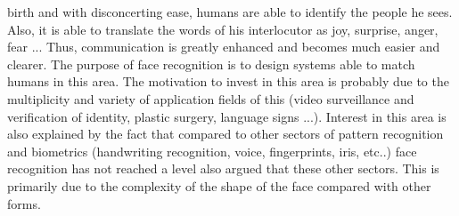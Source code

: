  birth and with disconcerting ease, humans are able to identify the people he sees. Also, it is able to translate the words of his interlocutor as joy, surprise, anger, fear ... Thus, communication is greatly enhanced and becomes much easier and clearer.
The purpose of face recognition is to design systems able to match humans in this area.
The motivation to invest in this area is probably due to the multiplicity and variety of application fields of this (video surveillance and verification of identity, plastic surgery, language signs ...). Interest in this area is also explained by the fact that compared to other sectors of pattern recognition and biometrics (handwriting recognition, voice, fingerprints, iris, etc..) face recognition has not reached a level also argued that these other sectors. This is primarily due to the complexity of the shape of the face compared with other forms.
